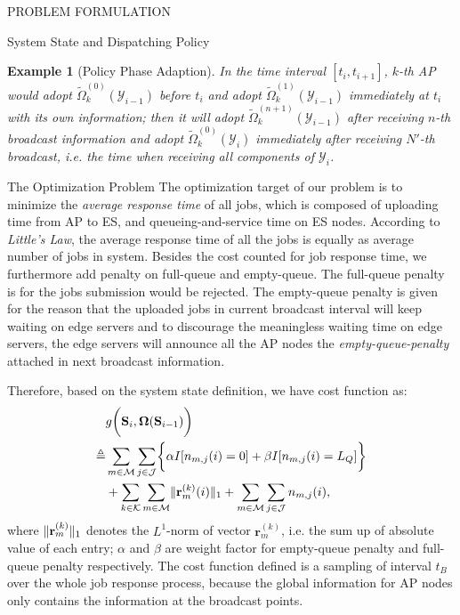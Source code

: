 \documentclass[10pt, conference, letterpaper]{IEEEtran}
\newtheorem{example}{Example}
\newcommand{\define}{\triangleq}
\renewcommand{\vec}{\mathbf}
\DeclarePairedDelimiter{\Inorm}{\|}{\|_1}
\DeclarePairedDelimiter{\Paren}{\bigg(}{\bigg)}
\DeclarePairedDelimiter{\Brace}{\bigg\{}{\bigg\}}
\newcommand{\apSet}{\mathcal{K}}
\newcommand{\esSet}{\mathcal{M}}
\newcommand{\jSpace}{\mathcal{J}}
\newcommand{\Stat}{\mathbf{S}}
\newcommand{\Obsv}{\mathcal{Y}}
\newcommand{\Policy}{\boldsymbol{\Omega}}
\begin{document}
\begin{section}{PROBLEM FORMULATION}
\begin{subsection}{System State and Dispatching Policy}
            \begin{example}[Policy Phase Adaption]
                In the time interval $[t_{i}, t_{i+1}]$, $k$-th AP would adopt $\tilde{\Omega}^{(0)}_k(\Obsv_{i-1})$ before $t_i$ and adopt $\tilde{\Omega}^{(1)}_k(\Obsv_{i-1})$ immediately at $t_i$ with its own information; then it will adopt $\tilde{\Omega}^{(n+1)}_k(\Obsv_{i-1})$ after receiving $n$-th broadcast information and adopt $\tilde{\Omega}^{(0)}_k(\Obsv_{i})$ immediately after receiving $N'$-th broadcast, i.e. the time when receiving all components of $\Obsv_{i}$.
            \end{example}
        \end{subsection}

        \begin{subsection}{The Optimization Problem}
            The optimization target of our problem is to minimize the \emph{average response time} of all jobs, which is composed of uploading time from AP to ES, and queueing-and-service time on ES nodes. According to \emph{Little's Law}, the average response time of all the jobs is equally as average number of jobs in system.
            Besides the cost counted for job response time, we furthermore add penalty on full-queue and empty-queue.
            The full-queue penalty is for the jobs submission would be rejected.
            {\color{red}The empty-queue penalty is given for the reason that the uploaded jobs in current broadcast interval will keep waiting on edge servers and to discourage the meaningless waiting time on edge servers, the edge servers will announce all the AP nodes the \emph{empty-queue-penalty} attached in next broadcast information.}

            Therefore, based on the system state definition, we have cost function as:
            \begin{align}
                &g\Paren{\Stat_{i}, \Policy(\Stat_{i-1})}
                \nonumber\\
                \define& \sum_{m\in\esSet}\sum_{j\in\jSpace} \Brace{
                        \alpha I[n_{m,j}(i)=0] + \beta I[n_{m,j}(i)=L_Q]
                    }
                    \nonumber\\
                    &+\sum_{k\in\apSet}\sum_{m\in\esSet} \Inorm{\vec{r}^{(k)}_{m}(i)} + \sum_{m\in\esSet}\sum_{j\in\jSpace} n_{m,j}(i),
            \end{align}
            where $\Inorm{\vec{r}^{(k)}_{m}}$ denotes the $L^1$-norm of vector $\vec{r}^{(k)}_{m}$, i.e. the sum up of absolute value of each entry; $\alpha$ and $\beta$ are weight factor for empty-queue penalty and full-queue penalty respectively.
            {\color{red}The cost function defined is a sampling of interval $t_B$ over the whole job response process, because the global information for AP nodes only contains the information at the broadcast points.}


\end{subsection}
\end{section}
\end{document}
